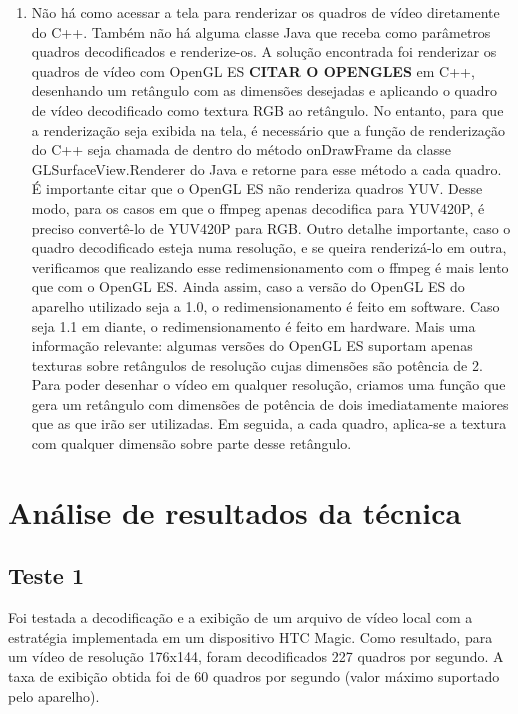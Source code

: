 \documentclass{acm_proc_article-sp}
\newcommand{\todo}[1]{\textcolor[rgb]{1.00,0.00,0.00}{\bf \uppercase{#1}}}
\begin{document}
\begin{enumerate}
 \item Não há como acessar a tela para renderizar os quadros de vídeo diretamente do C++. Também não há alguma classe Java que receba como parâmetros quadros decodificados e renderize-os. A solução encontrada foi renderizar os quadros de vídeo com OpenGL ES \todo{citar o opengles} em C++, desenhando um retângulo com as dimensões desejadas e aplicando o quadro de vídeo decodificado como textura RGB ao retângulo. No entanto, para que a renderização seja exibida na tela, é necessário que a função de renderização do C++ seja chamada de dentro do método onDrawFrame da classe GLSurfaceView.Renderer do Java e retorne para esse método a cada quadro. É importante citar que o OpenGL ES não renderiza quadros YUV. Desse modo, para os casos em que o ffmpeg apenas decodifica para YUV420P, é preciso convertê-lo de YUV420P para RGB. Outro detalhe importante, caso o quadro decodificado esteja numa resolução, e se queira renderizá-lo em outra, verificamos que realizando esse redimensionamento com o ffmpeg é mais lento que com o OpenGL ES. Ainda assim, caso a versão do OpenGL ES do aparelho utilizado seja a 1.0, o redimensionamento é feito em software. Caso seja 1.1 em diante, o redimensionamento é feito em hardware. Mais uma informação relevante: algumas versões do OpenGL ES suportam apenas texturas sobre retângulos de resolução cujas dimensões são potência de 2. Para poder desenhar o vídeo em qualquer resolução, criamos uma função que gera um retângulo com dimensões de potência de dois imediatamente maiores que as que irão ser utilizadas. Em seguida, a cada quadro, aplica-se a textura com qualquer dimensão sobre parte desse retângulo.
\end{enumerate}

\section{Análise de resultados da técnica}
\subsection{Teste 1}
Foi testada a decodificação e a exibição de um arquivo de vídeo local com a estratégia implementada em um dispositivo HTC Magic. Como resultado, para um vídeo de resolução 176x144, foram decodificados 227 quadros por segundo. A taxa de exibição obtida foi de 60 quadros por segundo (valor máximo suportado pelo aparelho).
\end{document}
